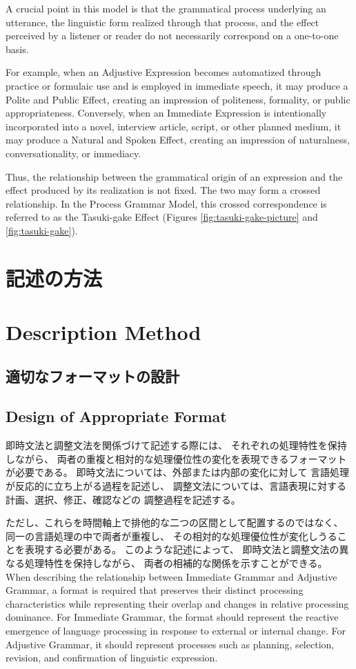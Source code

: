\documentclass[a4paper]{article}
\begin{document}
A crucial point in this model is that
the grammatical process underlying an utterance,
the linguistic form realized through that process,
and the effect perceived by a listener or reader
do not necessarily correspond on a one-to-one basis.

For example, when an Adjustive Expression becomes automatized through practice
or formulaic use and is employed in immediate speech,
it may produce a Polite and Public Effect,
creating an impression of politeness, formality, or public appropriateness.
Conversely, when an Immediate Expression is intentionally incorporated into
a novel, interview article, script, or other planned medium,
it may produce a Natural and Spoken Effect,
creating an impression of naturalness, conversationality, or immediacy.

Thus, the relationship between the grammatical origin of an expression
and the effect produced by its realization is not fixed.
The two may form a crossed relationship.
In the Process Grammar Model, this crossed correspondence is referred to as
the Tasuki-gake Effect
(Figures \ref{fig:tasuki-gake-picture} and \ref{fig:tasuki-gake}).
\fi

\ifJPN
\section{記述の方法}
\else
\section{Description Method}
\fi

\ifJPN
\subsection{適切なフォーマットの設計}
\else
\subsection{Design of Appropriate Format}
\fi

\ifJPN
即時文法と調整文法を関係づけて記述する際には、
それぞれの処理特性を保持しながら、
両者の重複と相対的な処理優位性の変化を表現できるフォーマットが必要である。
即時文法については、外部または内部の変化に対して
言語処理が反応的に立ち上がる過程を記述し、
調整文法については、言語表現に対する計画、選択、修正、確認などの
調整過程を記述する。

ただし、これらを時間軸上で排他的な二つの区間として配置するのではなく、
同一の言語処理の中で両者が重複し、
その相対的な処理優位性が変化しうることを表現する必要がある。
このような記述によって、
即時文法と調整文法の異なる処理特性を保持しながら、
両者の相補的な関係を示すことができる。
\else
When describing the relationship between Immediate Grammar and Adjustive Grammar,
a format is required that preserves their distinct processing characteristics
while representing their overlap and changes in relative processing dominance.
For Immediate Grammar, the format should represent the reactive emergence
of language processing in response to external or internal change.
For Adjustive Grammar, it should represent processes such as planning,
selection, revision, and confirmation of linguistic expression.
\end{document}
